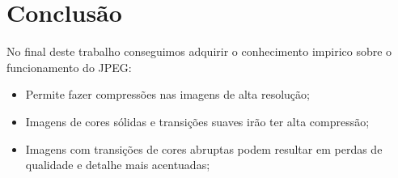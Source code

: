 \documentclass[a4paper, 12pt]{article}
\begin{document}
\pagebreak
\section{Conclusão}
    No final deste trabalho conseguimos adquirir o conhecimento impirico sobre o funcionamento do JPEG:
    \begin{itemize}
        \item Permite fazer compressões nas imagens de alta resolução;
        \item Imagens de cores sólidas e transições suaves irão ter alta compressão;
        \item Imagens com transições de cores abruptas podem resultar em perdas de qualidade e detalhe mais acentuadas;
    \end{itemize}
\end{document}
